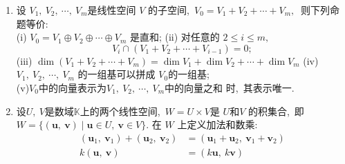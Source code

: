 \begin{enumerate}
		\item 设 $ V_{1},\  V_{2},\  \cdots,\  V_{m}  $是线性空间  $V $ 的子空间,\   $V_{0}=V_{1}+   V_{2}+\cdots+V_{m} ,\ $ 则下列命题等价:\\
		(i)  $V_{0}=V_{1} \oplus V_{2} \oplus \cdots \oplus V_{m} $ 是直和;
		(ii) 对任意的  $2 \leqslant i \leqslant m ,\ $
		$$V_{i} \cap\left(V_{1}+V_{2}+\cdots+V_{i-1}\right)=0 ;$$
		(iii)  $\operatorname{dim}\left(V_{1}+V_{2}+\cdots+V_{m}\right)=\operatorname{dim} V_{1}+\operatorname{dim} V_{2}+\cdots+   \operatorname{dim} V_{m}$ 
		(iv)$  V_{1},\  V_{2},\  \cdots,\  V_{m} $ 的一组基可以拼成 $ V_{0}  $的一组基;\\
		(v)$  V_{0}  $中的向量表示为$  V_{1},\  V_{2},\  \cdots,\  V_{m}  $中的向量之和 时,\ 其表示唯一.
		\item 设$  U,\  V  $是数域$  \mathbb{K}  $上的两个线性空间,\  $ W=U \times V  $是  $U  $和$  V$  的积集合,\  即 $ W=\{(\boldsymbol{u},\  \boldsymbol{v}) \mid \boldsymbol{u} \in U,\  \boldsymbol{v} \in V\} .$ 在 $ W $ 上定义加法和数乘:
		$$\begin{aligned}
			\left(\boldsymbol{u}_{1},\  \boldsymbol{v}_{1}\right)+\left(\boldsymbol{u}_{2},\  \boldsymbol{v}_{2}\right) &=\left(\boldsymbol{u}_{1}+\boldsymbol{u}_{2},\  \boldsymbol{v}_{1}+\boldsymbol{v}_{2}\right) \\
			k(\boldsymbol{u},\  \boldsymbol{v}) &=(k \boldsymbol{u},\  k \boldsymbol{v})
		\end{aligned}$$
		

\end{enumerate}
